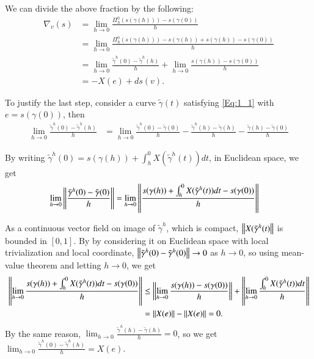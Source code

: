 \documentclass[a4paper, 12pt]{article}
\theoremstyle{Mydefinition}
\theoremstyle{Mytheorem}
\begin{document}
We can divide the above fraction by the following:
\begin{equation*}
\begin{split}
    \nabla_v (s) &= \lim_{h\rightarrow 0}\frac{\Pi^0_h (s(\gamma(h)))-s(\gamma(0))}{h}\\
    &=\lim_{h\rightarrow 0}\frac{\Pi^0_h (s(\gamma(h)))-s(\gamma(h)) + s(\gamma(h))-s(\gamma(0))}{h} \\
    &=\lim_{h\rightarrow 0}\frac{\tilde{\gamma}^h(0)-\tilde{\gamma}^h(h)}{h} +\lim_{h\rightarrow 0}\frac{s(\gamma(h))-s(\gamma(0))}{h}\\
    &=-X(e) +ds(v).
\end{split}
\end{equation*}

To justify the last step, consider a curve $\tilde{\gamma}(t)$ satisfying \eqref{Eq:1_1} with $e=s(\gamma(0))$, then
\begin{equation*}
    \begin{split}
        \lim_{h\rightarrow 0}\frac{\tilde{\gamma}^h(0)-\tilde{\gamma}^h(h)}{h} &= \lim_{h\rightarrow 0}\frac{\tilde{\gamma}^h(0)-\tilde{\gamma}(0)}{h}-\frac{\tilde{\gamma}^h(h)-\tilde{\gamma}(h)}{h} - \frac{\tilde{\gamma}(h)-\tilde{\gamma}(0)}{h}
    \end{split}
\end{equation*}

By writing $\tilde{\gamma}^h(0) = s(\gamma(h)) + \int_h^0 X(\tilde{\gamma}^h(t)) dt$, in Euclidean space, we get
\begin{equation*}
\begin{split}
    \lim_{h\rightarrow 0}\norm{\frac{\tilde{\gamma}^h(0)-\tilde{\gamma}(0)}{h}} &=\lim_{h\rightarrow 0}\norm{\frac{s(\gamma(h)) + \int_h^0 X(\tilde{\gamma}^h(t)) dt-s(\gamma(0))}{h}}
\end{split}
\end{equation*}

As a continuous vector field on image of $\tilde{\gamma}^h$, which is compact, $\norm{X(\tilde{\gamma}^h(t)}$ is bounded in $[0,1]$. By by considering it on Euclidean space with local trivialization and local coordinate, $\norm{\tilde{\gamma}^h(0)-\tilde{\gamma}^h(0)}\rightarrow 0$ as $h\rightarrow 0$, so using mean-value theorem and letting $h\rightarrow 0$, we get 
\begin{equation*}
\begin{split}
    \norm{\lim_{h\rightarrow 0}\frac{s(\gamma(h)) + \int_h^0 X(\tilde{\gamma}^h(t)) dt-s(\gamma(0))}{h}} &\leq \norm{\lim_{h\rightarrow 0}\frac{s(\gamma(h))-s(\gamma(0))}{h}} + \norm{\lim_{h\rightarrow 0}\frac{ \int_h^0 X(\tilde{\gamma}^h(t)) dt}{h}} \\
    &= \norm{X(e)}-\norm{X(e)} = 0.
\end{split}
\end{equation*}
By the same reason, $\lim_{h\rightarrow 0}\frac{\tilde{\gamma}^h(h)-\tilde{\gamma}(h)}{h} = 0$, so we get $ \lim_{h\rightarrow 0}\frac{\tilde{\gamma}^h(0)-\tilde{\gamma}^h(h)}{h} = X(e)$.
\end{document}
